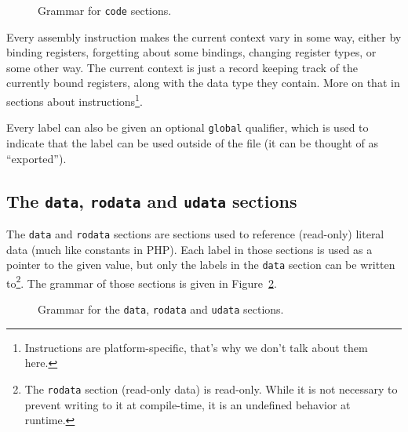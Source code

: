 \begin{figure}[htb]
  \centering


  \caption{Grammar for \texttt{code} sections.}
  \label{fig:nstar-common-sections-code-grammar}
\end{figure}

Every assembly instruction makes the current context vary in some way, either by binding registers, forgetting about some bindings, changing register types, or some other way. The current context is just a record keeping track of the currently bound registers, along with the data type they contain.
More on that in sections about instructions\footnote{Instructions are platform-specific, that's why we don't talk about them here.}.

Every label can also be given an optional \texttt{global} qualifier, which is used to indicate that the label can be used outside of the file (it can be thought of as ``exported'').

\subsection{The \texttt{data}, \texttt{rodata} and \texttt{udata} sections}\label{subsec:nstar-common-sections-data}

The \texttt{data} and \texttt{rodata} sections are sections used to reference (read-only) literal data (much like constants in PHP).
Each label in those sections is used as a pointer to the given value, but only the labels in the \texttt{data} section can be written to\footnote{The \texttt{rodata} section (read-only data) is read-only. While it is not necessary to prevent writing to it at compile-time, it is an undefined behavior at runtime.}.
The grammar of those sections is given in Figure~\ref{fig:nstar-common-sections-data-grammar}.

\begin{figure}[htb]
  \centering


  \caption{Grammar for the \texttt{data}, \texttt{rodata} and \texttt{udata} sections.}
  \label{fig:nstar-common-sections-data-grammar}
\end{figure}

